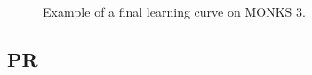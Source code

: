 \begin{appendices}
\begin{figure}[H]
\begin{subfigure}{0.60\textwidth}
{                        }
                        \caption{}
                        \label{fig:monks_3_ACC_CGD_HS}
                    \end{subfigure}
                    \caption{Example of a final learning curve on MONKS 3.}
                    \label{fig:monks_3_CGD_HS}
                \end{figure}


            \subsection{PR} %
            \label{sub:pr}

                \begin{figure}[H]
                    \centering
                    \begin{subfigure}{0.60\textwidth}
                        \caption{}
                        \label{fig:monks_1_MSE_CGD_PR}
                    \end{subfigure}
                    \begin{subfigure}{0.60\textwidth}
                        \resizebox{\textwidth}{!}{
}
\end{subfigure}
\end{figure}
\end{appendices}
